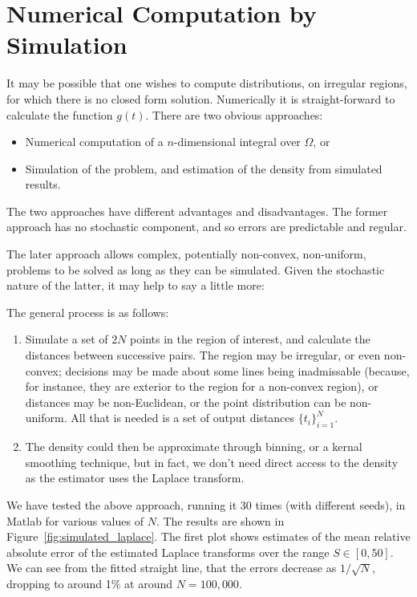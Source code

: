 \section{Numerical Computation by Simulation}
\label{sec:numerical}

It may be possible that one wishes to compute distributions, on
irregular regions, for which there is no closed form solution.
Numerically it is straight-forward to calculate the function
$g(t)$. There are two obvious approaches:
\begin{itemize}

\item Numerical computation of a $n$-dimensional integral over
  $\Omega$, or

\item Simulation of the problem, and estimation of the density from
  simulated results. 

\end{itemize}
The two approaches have different advantages and disadvantages. The
former approach has no stochastic component, and so errors are
predictable and regular. 

The later approach allows complex, potentially non-convex,
non-uniform, problems to be solved as long as they can be
simulated. Given the stochastic nature of the latter, it may help to
say a little more:

The general process is as follows:
\begin{enumerate}

\item Simulate a set of $2N$ points in the region of interest, and
  calculate the distances between successive pairs. The region may be
  irregular, or even non-convex; decisions may be made about some
  lines being inadmissable (because, for instance, they are exterior
  to the region for a non-convex region), or distances may be
  non-Euclidean, or the point distribution can be non-uniform. All
  that is needed is a set of output distances $\{ t_i \}_{i=1}^{N}$.

\item The density could then be approximate through binning, or a
  kernal smoothing technique, but in fact, we don't need direct access
  to the density as the estimator uses the Laplace transform.

\end{enumerate}

We have tested the above approach, running it 30 times (with different
seeds), in Matlab for various values of $N$. The results are shown in
Figure~\ref{fig:simulated_laplace}. The first plot shows estimates of
the mean relative absolute error of the estimated Laplace transforms
over the range $S \in [0, 50]$. We can see from the fitted straight
line, that the errors decrease as $1/\sqrt{N}$, dropping to around 1\%
at around $N=100,000$.



